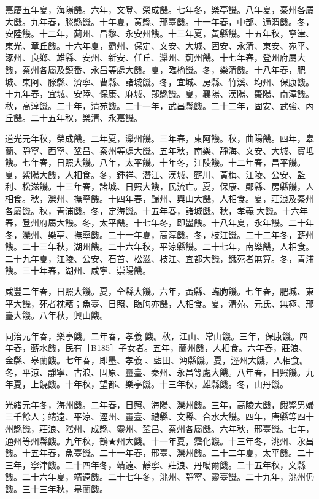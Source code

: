 \begin{pinyinscope}
嘉慶五年夏，海陽饑。六年，文登、榮成饑。七年冬，樂亭饑。八年夏，秦州各屬大饑。九年春，滕縣饑。十年夏，黃縣、邢臺饑。十一年春，中部、通渭饑。冬，安陸饑。十二年，薊州、昌黎、永安州饑。十三年夏，黃縣饑。十五年秋，寧津、東光、章丘饑。十六年夏，霸州、保定、文安、大城、固安、永清、東安、宛平、涿州、良鄉、雄縣、安州、新安、任丘、灤州、薊州饑。十七年春，登州府屬大饑，秦州各屬及鎮番、永昌等處大饑。夏，臨榆饑。冬，樂清饑。十八年春，肥城、東阿、滕縣、濟寧、曹縣、諸城饑。冬，宜城、房縣、竹溪、均州、保康饑。十九年春，宜城、安陸、保康、麻城、鄖縣饑。夏，襄陽、漢陽、棗陽、南漳饑。秋，高淳饑。二十年，清苑饑。二十一年，武昌縣饑。二十二年，固安、武強、內丘饑。二十五年秋，樂清、永嘉饑。

道光元年秋，榮成饑。二年夏，灤州饑。三年春，東阿饑。秋，曲陽饑。四年，皋蘭、靜寧、西寧、鞏昌、秦州等處大饑。五年秋，南樂、靜海、文安、大城、寶坻饑。七年春，日照大饑。八年，太平饑。十年冬，江陵饑。十二年春，昌平饑。夏，紫陽大饑，人相食。冬，鍾祥、潛江、漢城、蘄川、黃梅、江陵、公安、監利、松滋饑。十三年春，諸城、日照大饑，民流亡。夏，保康、鄖縣、房縣饑，人相食。秋，灤州、撫寧饑。十四年春，歸州、興山大饑，人相食。夏，莊浪及秦州各屬饑。秋，青浦饑。冬，定海饑。十五年春，諸城饑。秋，孝義大饑。十六年春，登州府屬大饑。冬，太平饑。十七年冬，即墨饑。十八年夏，永年饑。二十年冬，灤州、樂亭、撫寧饑。二十一年夏，高淳饑。冬，枝江饑。二十二年冬，蘄州饑。二十三年秋，湖州饑。二十六年秋，平涼縣饑。二十七年，南樂饑，人相食。二十九年夏，江陵、公安、石首、松滋、枝江、宜都大饑，餓死者無算。冬，青浦饑。三十年春，湖州、咸寧、崇陽饑。

咸豐二年春，日照大饑。夏，全縣大饑。六年，黃縣、臨朐饑。七年春，肥城、東平大饑，死者枕藉；魚臺、日照、臨朐亦饑，人相食。夏，清苑、元氏、無極、邢臺大饑。八年秋，興山饑。

同治元年春，樂亭饑。二年春，孝義饑。秋，江山、常山饑。三年，保康饑。四年春，蘄水饑，民有［B185］子女者。五年，蘭州饑，人相食。六年春，莊浪、金縣、皋蘭饑。七年春，即墨、孝義、藍田、沔縣饑。夏，涇州大饑，人相食。冬，平涼、靜寧、古浪、固原、靈臺、秦州、永昌等處大饑。八年春，日照饑。九年夏，上饒饑。十年秋，望都、樂亭饑。十三年秋，雄縣饑。冬，山丹饑。

光緒元年冬，海州饑。二年春，日照、海陽、灤州饑。三年，高陵大饑，餓斃男婦三千餘人；靖遠、平涼、涇州、靈臺、禮縣、文縣、合水大饑。四年，唐縣等四十州縣饑，莊浪、階州、成縣、靈州、鞏昌、秦州各屬饑。六年秋，邢臺饑。七年，通州等州縣饑。九年秋，鶴★州大饑。十一年夏，霑化饑。十三年冬，洮州、永昌饑。十五年春，魚臺饑。二十一年春，邢臺、灤州饑。二十二年夏，太平饑。二十三年，寧津饑。二十四年冬，靖遠、靜寧、莊浪、丹噶爾饑。二十五年秋，文縣饑。二十六年夏，靖遠饑。二十七年冬，洮州、靜寧、靈臺饑。二十九年，洮州仍饑。三十三年秋，皋蘭饑。


\end{pinyinscope}
